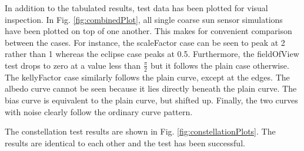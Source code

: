 In addition to the tabulated results, test data has been plotted for visual inspection. In Fig. \ref{fig:combinedPlot}, all single coarse sun sensor simulations have been plotted on top of one another. This makes for convenient comparison between the cases. For instance, the scaleFactor case can be seen to peak at 2 rather than 1 whereas the eclipse case peaks at 0.5. Furthermore, the fieldOfView test drops to zero at a value less than $\frac{\pi}{2}$ but it follows the plain case otherwise. The kellyFactor case similarly follows the plain curve, except at the edges. The albedo curve cannot be seen because it lies directly beneath the plain curve. The bias curve is equivalent to the plain curve, but shifted up. Finally, the two curves with noise clearly follow the ordinary curve pattern.


\clearpage
The constellation test results are shown in Fig. \ref{fig:constellationPlots}. The results are identical to each other and the test has been successful.



